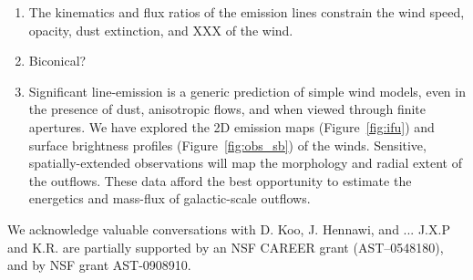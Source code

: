 \documentclass[12pt,preprint]{aastex}
\begin{document}
\begin{enumerate}

\item The kinematics and flux ratios of the emission lines 
  constrain the wind speed, opacity, dust extinction, and XXX of the
  wind.

\item Biconical?

\item Significant line-emission is a generic prediction of simple wind
  models, even in the presence of dust, anisotropic flows, and when
  viewed through finite apertures.  We have explored the 2D emission
  maps (Figure~\ref{fig:ifu}) and surface brightness profiles (Figure~\ref{fig:obs_sb}) of
  the winds.  Sensitive, spatially-extended observations will map the
  morphology and radial extent of the outflows.  These data afford the
  best opportunity to estimate the energetics and mass-flux of
  galactic-scale outflows.


\end{enumerate}

\acknowledgments

We acknowledge valuable conversations with D. Koo, J. Hennawi, and ... 
J.X.P and K.R. are partially supported
by an NSF CAREER grant (AST--0548180), and 
by NSF grant AST-0908910.

\clearpage

%
%



\clearpage







\end{document}
